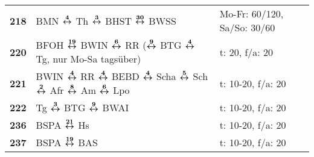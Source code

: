 \begin{minipage}[t]{0.45\textwidth}
\begin{tabular}{>{\bfseries}L{1.2cm}L{9.0cm}L{3.0cm}}
\bus{} 218    & BMN $\boldsymbol{\overset{4}{\leftrightarrow}}$ Th $\boldsymbol{\overset{3}{\leftrightarrow}}$ BHST $\boldsymbol{\overset{30}{\leftrightarrow}}$ BWSS                                                                                                               & Mo-Fr: 60/120, Sa/So: 30/60\\
\bus{} 220    & BFOH $\boldsymbol{\overset{19}{\leftrightarrow}}$ BWIN $\boldsymbol{\overset{6}{\leftrightarrow}}$ RR ($\boldsymbol{\overset{9}{\leftrightarrow}}$ BTG $\boldsymbol{\overset{4}{\leftrightarrow}}$ Tg, nur Mo-Sa tagsüber)                                                                          & t: 20, f/a: 20             \\
\bus{} 221    & BWIN $\boldsymbol{\overset{4}{\leftrightarrow}}$ RR $\boldsymbol{\overset{4}{\leftrightarrow}}$ BEBD $\boldsymbol{\overset{4}{\leftrightarrow}}$ Scha $\boldsymbol{\overset{5}{\leftrightarrow}}$ Sch $\boldsymbol{\overset{2}{\leftrightarrow}}$ Afr $\boldsymbol{\overset{8}{\leftrightarrow}}$ Am $\boldsymbol{\overset{6}{\leftrightarrow}}$ Lpo                                                & t: 10-20, f/a: 20          \\
\bus{} 222    & Tg $\boldsymbol{\overset{3}{\leftrightarrow}}$ BTG $\boldsymbol{\overset{9}{\leftrightarrow}}$ BWAI
& t: 10-20, f/a: 20          \\
\bus{} 236    & BSPA $\boldsymbol{\overset{21}{\leftrightarrow}}$ Hs                                                                                                                                                & t: 10-20, f/a: 20          \\
\bus{} 237    & BSPA $\boldsymbol{\overset{19}{\leftrightarrow}}$ BAS                                                                                                                                               & t: 10-20, f/a: 20          \\
\hline
\end{tabular}
\end{minipage}
